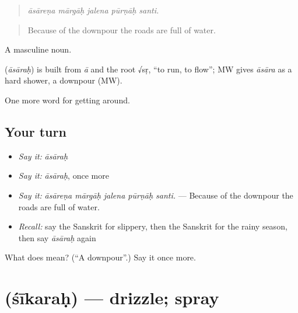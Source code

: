 \begin{quote}
    
\end{quote}

\begin{quote}
\emph{āsāreṇa mārgāḥ jalena pūrṇāḥ santi.}
\end{quote}

\begin{quote}
Because of the downpour the roads are full of water.
\end{quote}

A masculine noun.

\begin{cousinweb}
\textbf{} (\emph{āsāraḥ}) is built from \emph{ā} and the root √sṛ, \textquotedblleft{}to run, to flow\textquotedblright{}; MW gives \emph{āsāra} as a hard shower, a downpour (MW).
\end{cousinweb}

\begin{grammarlens}[title={What you've built}]
One more word for getting around.
\end{grammarlens}

\subsection*{Your turn}
\begin{itemize}
\raggedright
  \item \emph{Say it:} \emph{āsāraḥ}
  \item \emph{Say it:} \emph{āsāraḥ}, once more
  \item \emph{Say it:} \emph{āsāreṇa mārgāḥ jalena pūrṇāḥ santi.} — Because of the downpour the roads are full of water.
  \item \emph{Recall:} say the Sanskrit for slippery, then the Sanskrit for the rainy season, then say \emph{āsāraḥ} again
\end{itemize}

\begin{tcolorbox}[breakable,colback=teal!4,colframe=teal!35!black,title={Before you move on}]
What does  mean? (\textquotedblleft{}A downpour\textquotedblright{}.) Say it once more.
\end{tcolorbox}
\section[\texorpdfstring{\sk{शीकरः} (śīkaraḥ)}{शीकरः (śīkaraḥ)}]{ (śīkaraḥ) — drizzle; spray}

